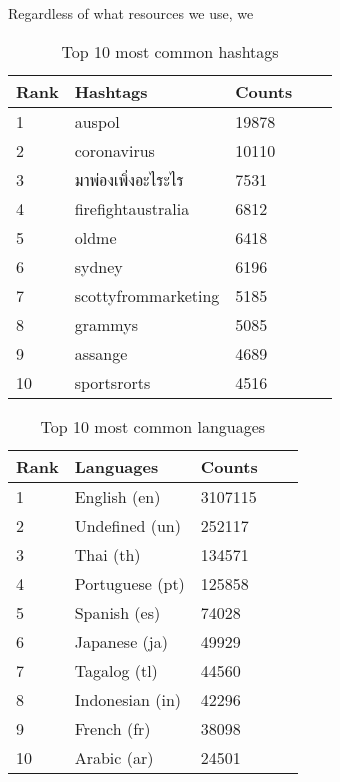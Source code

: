 \documentclass[11pt]{article}
\begin{document}
Regardless of what resources we use, we 
\begin{table}[h]
 \begin{center}
\begin{tabular}{|l|l|l|l|l|}

      \hline
      Rank &Hashtags & Counts   \\
      \hline\hline
      1 & auspol & 19878 \\
      2 & coronavirus & 10110 \\
      3 & มาพ่องเพิ่งอะไระไร & 7531 \\
      4 & firefightaustralia & 6812 \\
      5 & oldme & 6418 \\
      6 & sydney & 6196 \\
      7 & scottyfrommarketing & 5185\\
      8 & grammys & 5085 \\
      9 & assange & 4689 \\
      10 & sportsrorts & 4516 \\
    
     \hline

\end{tabular}
\caption{Top 10 most common hashtags}\label{table1}
 \end{center}
\end{table}


\begin{table}[h]
 \begin{center}
\begin{tabular}{|l|l|l|l|l|}

      \hline
      Rank &Languages & Counts   \\
      \hline\hline
      1 & English (en) & 3107115 \\
      2 & Undefined (un) & 252117 \\
      3 & Thai (th) & 134571 \\
      4 & Portuguese (pt) & 125858 \\
      5 & Spanish (es) & 74028 \\
      6 & Japanese (ja) & 49929 \\
      7 & Tagalog (tl) & 44560\\
      8 & Indonesian (in) & 42296 \\
      9 & French (fr) & 38098 \\
      10 & Arabic (ar) & 24501 \\
    
     \hline

\end{tabular}
\caption{Top 10 most common languages}\label{table2}
 \end{center}
\end{table}
\end{document}
